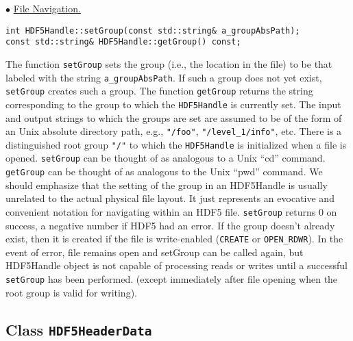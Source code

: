 \begin{trivlist}
\item $\bullet$
\underline{File Navigation.}
\begin{verbatim}
int HDF5Handle::setGroup(const std::string& a_groupAbsPath);
const std::string& HDF5Handle::getGroup() const;
\end{verbatim}
The function \verb/setGroup/ sets the group (i.e., the location in the
file) to be that labeled with the string {\tt a\_groupAbsPath}. If such a
group does not yet exist, {\tt setGroup} creates such a group.
The function \verb/getGroup/ returns the string corresponding to the
group to which the {\tt HDF5Handle} is currently set.
The input and output strings to which the groups are set are assumed to
be of the form of an Unix absolute directory path, e.g., 
{\tt "/foo"}, {\tt "/level\_1/info"}, etc. There is a distinguished root
group {\tt "/"} to which the {\tt HDF5Handle} is initialized when a file is
opened.
\verb/setGroup/ can be thought
of as analogous to a Unix ``cd'' command.  \verb/getGroup/ can be
thought of as analogous to the Unix ``pwd'' command.
We should emphasize that the setting of the group in an HDF5Handle is
usually unrelated to the actual physical file layout. 
It just represents an evocative and
convenient notation for navigating within an HDF5 file.
\verb/setGroup/ returns 0 on success, a negative number if HDF5
had an error.  If the group doesn't already exist, then it is
created if the file is write-enabled ({\tt CREATE} or {\tt OPEN\_RDWR}).  
In the event of error, file remains open and setGroup can be
called again, but HDF5Handle object is not capable of processing
reads or writes until a successful \verb/setGroup/ has been performed.
(except immediately after file opening when the root group is
valid for writing).

\end{trivlist}

\subsection{Class {\tt HDF5HeaderData}}

